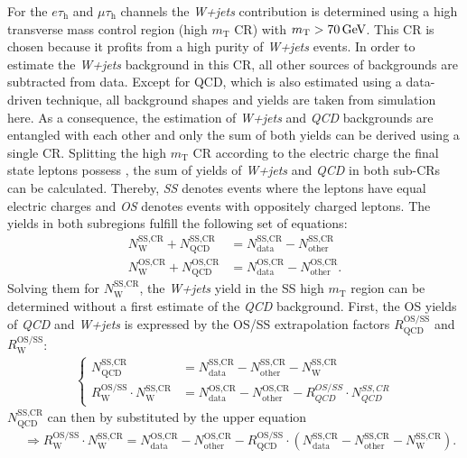For the $e\tau_\text{h}$ and $\mu\tau_\text{h}$ channels the \textit{W+jets} contribution is determined using a high transverse mass control region (high $m_\text{T}$ CR) with $m_\text{T}>\text{70\,{GeV}}$. This CR is chosen because it profits from a high
purity of \textit{W+jets} events. %
In order to estimate the \textit{W+jets} background in this CR, all other sources of backgrounds are subtracted from data. Except for QCD, which is also estimated using a data-driven technique, all background shapes and 
yields are taken from simulation here. As a consequence, the estimation of \textit{W+jets} and \textit{QCD} backgrounds are entangled with each other and only the sum of both yields can be derived using a single CR. Splitting the high $m_\text{T}$ CR according to the electric charge the final state leptons possess
, the sum of yields of \textit{W+jets} and \textit{QCD} in both sub-CRs can be calculated. Thereby, \textit{SS} denotes events where the leptons have equal electric charges and \textit{OS} denotes events with oppositely charged leptons.
The yields in both subregions fulfill the following set of equations:
\begin{align}
    N_\text{W}^\text{SS,CR} + N_\text{QCD}^\text{SS,CR} &= N_\text{data}^\text{SS,CR} - N_\text{other}^\text{SS,CR} \\
    N_\text{W}^\text{OS,CR} + N_\text{QCD}^\text{OS,CR} &= N_\text{data}^\text{OS,CR} - N_\text{other}^\text{OS,CR}. 
\end{align}
Solving them for $N_\text{W}^\text{SS,CR}$, the \textit{W+jets} yield in the SS high $m_\text{T}$ region can be determined without a first estimate 
of the \textit{QCD} background.
First, the OS yields of \textit{QCD} and \textit{W+jets} is expressed by the OS/SS extrapolation factors $R_\text{QCD}^\text{OS/SS}$ and  $R_\text{W}^\text{OS/SS}$:
\begin{align*}
    \begin{cases}  
        N_\text{QCD}^\text{SS,CR} &= N_\text{data}^\text{SS,CR} - N_\text{other}^\text{SS,CR} - N_\text{W}^\text{SS,CR} \\
        R_\text{W}^\text{OS/SS} \cdot N_\text{W}^\text{SS,CR} &= N_\text{data}^\text{OS,CR} - N_\text{other}^\text{OS,CR} - R_{QCD}^{OS/SS}\cdot N_{QCD}^{SS,CR} 
    \end{cases}
\end{align*}
$N_\text{QCD}^\text{SS,CR}$ can then by substituted by the upper equation
\begin{align*}
    &\Rightarrow R_\text{W}^\text{OS/SS} \cdot N_\text{W}^\text{SS,CR} = N_\text{data}^\text{OS,CR} - N_\text{other}^\text{OS,CR} - R_\text{QCD}^\text{OS/SS}\cdot \left( N_\text{data}^\text{SS,CR} - N_\text{other}^\text{SS,CR} - N_\text{W}^\text{SS,CR} \right).   
\end{align*}
